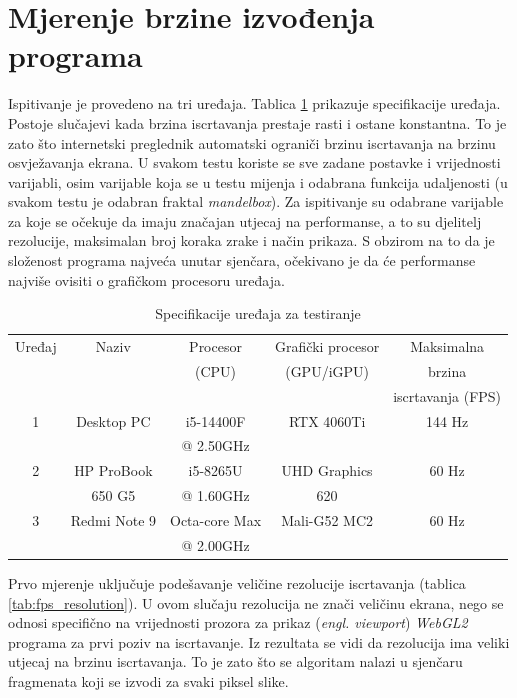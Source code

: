\documentclass[zavrsnirad, upload]{fer}
\begin{document}
\section{Mjerenje brzine izvođenja programa}

Ispitivanje je provedeno na tri uređaja. Tablica \ref{tab:fps_device} prikazuje specifikacije uređaja. Postoje slučajevi kada brzina iscrtavanja prestaje rasti i ostane konstantna. To je zato što internetski preglednik automatski ograniči brzinu iscrtavanja na brzinu osvježavanja ekrana. U svakom testu koriste se sve zadane postavke i vrijednosti varijabli, osim varijable koja se u testu mijenja i odabrana funkcija udaljenosti (u svakom testu je odabran fraktal \emph{mandelbox}). Za ispitivanje su odabrane varijable za koje se očekuje da imaju značajan utjecaj na performanse, a to su djelitelj rezolucije, maksimalan broj koraka zrake i način prikaza. S obzirom na to da je složenost programa najveća unutar sjenčara, očekivano je da će performanse najviše ovisiti o grafičkom procesoru uređaja.

\begin{table}[htb]
	\centering
	\caption{Specifikacije uređaja za testiranje}
	\label{tab:fps_device}
	\begin{tabular}{|c|c|c|c|c|}
		\hline
		Uređaj & Naziv & Procesor & Grafički procesor & Maksimalna \\
		 & & (CPU) & (GPU/iGPU) & brzina \\
        & & & & iscrtavanja (FPS)\\
		\hline
		1 & Desktop PC & i5-14400F  & RTX 4060Ti & 144 Hz \\
        & & @ 2.50GHz & & \\
		\hline
        2 & HP ProBook & i5-8265U  & UHD Graphics & 60 Hz\\
        &  650 G5 & @ 1.60GHz &  620 & \\
		\hline
        3 & Redmi Note 9 & Octa-core Max  & Mali-G52 MC2 & 60 Hz\\
        & & @ 2.00GHz & & \\
		\hline
	\end{tabular}
\end{table}

Prvo mjerenje uključuje podešavanje veličine rezolucije iscrtavanja (tablica \ref{tab:fps_resolution}). U ovom slučaju rezolucija ne znači veličinu ekrana, nego se odnosi specifično na vrijednosti prozora za prikaz (\emph{engl. viewport}) \emph{WebGL2} programa za prvi poziv na iscrtavanje. Iz rezultata se vidi da rezolucija ima veliki utjecaj na brzinu iscrtavanja. To je zato što se algoritam nalazi u sjenčaru fragmenata koji se izvodi za svaki piksel slike.
\end{document}
